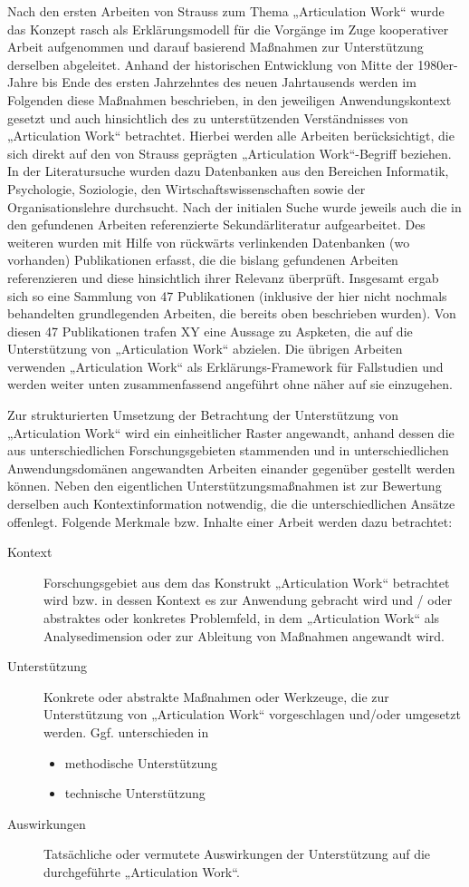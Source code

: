 Nach den ersten Arbeiten von Strauss zum Thema „Articulation Work“ wurde das Konzept rasch als Erklärungsmodell für die Vorgänge im Zuge kooperativer Arbeit aufgenommen und darauf basierend Maßnahmen zur Unterstützung derselben abgeleitet. Anhand der historischen Entwicklung von Mitte der 1980er-Jahre bis Ende des ersten Jahrzehntes des neuen Jahrtausends werden im Folgenden diese Maßnahmen beschrieben, in den jeweiligen Anwendungskontext gesetzt und auch hinsichtlich des zu unterstützenden Verständnisses von „Articulation Work“ betrachtet. Hierbei werden alle Arbeiten berücksichtigt, die sich direkt auf den von Strauss geprägten „Articulation Work“-Begriff beziehen. In der Literatursuche wurden dazu Datenbanken aus den Bereichen Informatik, Psychologie, Soziologie, den Wirtschaftswissenschaften sowie der Organisationslehre durchsucht. Nach der initialen Suche wurde jeweils auch die in den gefundenen Arbeiten referenzierte Sekundärliteratur aufgearbeitet. Des weiteren wurden mit Hilfe von rückwärts verlinkenden Datenbanken (wo vorhanden) Publikationen erfasst, die die bislang gefundenen Arbeiten referenzieren und diese hinsichtlich ihrer Relevanz überprüft. Insgesamt ergab sich so eine Sammlung von 47 Publikationen (inklusive der hier nicht nochmals behandelten grundlegenden Arbeiten, die bereits oben beschrieben wurden). Von diesen 47 Publikationen trafen XY eine Aussage zu Aspketen, die auf die Unterstützung von „Articulation Work“ abzielen. Die übrigen Arbeiten verwenden „Articulation Work“ als Erklärungs-Framework für Fallstudien und werden weiter unten zusammenfassend angeführt ohne näher auf sie einzugehen.

Zur strukturierten Umsetzung der Betrachtung der Unterstützung von „Articulation Work“ wird ein einheitlicher Raster angewandt, anhand dessen die aus unterschiedlichen Forschungsgebieten stammenden und in unterschiedlichen Anwendungsdomänen angewandten Arbeiten einander gegenüber gestellt werden können. Neben den eigentlichen Unterstützungsmaßnahmen ist zur Bewertung derselben auch Kontextinformation notwendig, die die unterschiedlichen Ansätze offenlegt. Folgende Merkmale bzw. Inhalte einer Arbeit werden dazu betrachtet:

\begin{description}
	\item[Kontext] Forschungsgebiet aus dem das Konstrukt „Articulation Work“ betrachtet wird bzw. in dessen Kontext es zur Anwendung gebracht wird und / oder abstraktes oder konkretes Problemfeld, in dem „Articulation Work“ als Analysedimension oder zur Ableitung von Maßnahmen angewandt wird.
	\item[Unterstützung] Konkrete oder abstrakte Maßnahmen oder Werkzeuge, die zur Unterstützung von „Articulation Work“ vorgeschlagen und/oder umgesetzt werden. Ggf. unterschieden in
	\begin{itemize}
		\item methodische Unterstützung
		\item technische Unterstützung
	\end{itemize}
	\item[Auswirkungen] Tatsächliche oder vermutete Auswirkungen der Unterstützung auf die durchgeführte „Articulation Work“.
\end{description}

